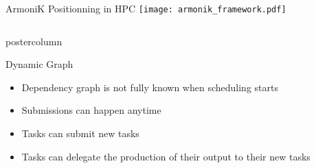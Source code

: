 \begin{frame}[fragile]
  \begin{center}
  \begin{minipage}[T]{.975\textwidth}
  \begin{block}{ArmoniK Positionning in HPC}
    \centering
    \texttt{[image: armonik\_framework.pdf]}
  \end{block}
  \end{minipage}
  \end{center}
  \vfill

  \begin{columns}[T]
    \begin{column}{.49\textwidth}
      \begin{beamercolorbox}[center,wd=\textwidth]{postercolumn}
        \begin{minipage}[T]{.96\textwidth}
          \begin{block}{Dynamic Graph}
          \begin{itemize}
              \item Dependency graph is not fully known when scheduling starts
              \item Submissions can happen anytime
              \item Tasks can submit new tasks
              \item Tasks can delegate the production of their output to their new tasks
          \end{itemize}
          \centering
          
          \end{block}



\end{minipage}
\end{beamercolorbox}
\end{column}
\end{columns}
\end{frame}
